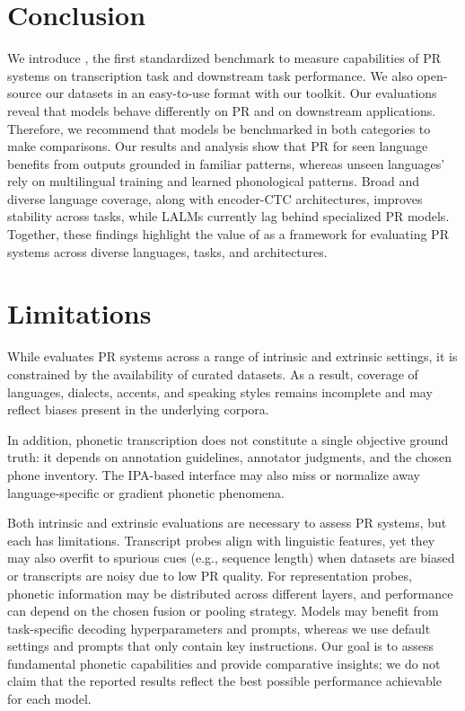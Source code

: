 \section{Conclusion}
We introduce \bench, the first standardized benchmark to measure capabilities of PR systems on transcription task and downstream task performance.
We also open-source our datasets in an easy-to-use format with our toolkit.
Our evaluations reveal that models behave differently on PR and on downstream applications.
Therefore, we recommend that models be benchmarked in both categories to make comparisons.
Our results and analysis show that 
PR for seen language benefits from outputs grounded in familiar patterns, whereas unseen languages' rely on multilingual training and learned phonological patterns. 
Broad and diverse language coverage, along with encoder-CTC architectures, improves stability across tasks, 
while LALMs currently lag behind specialized PR models.
Together, these findings highlight the value of \bench as a framework for evaluating PR systems across diverse languages, tasks, and architectures.

\section*{Limitations}
While \bench evaluates PR systems across a range of intrinsic and extrinsic settings, it is constrained by the availability of curated datasets. As a result, coverage of languages, dialects, accents, and speaking styles remains incomplete and may reflect biases present in the underlying corpora.

In addition, phonetic transcription does not constitute a single objective ground truth: it depends on annotation guidelines, annotator judgments, and the chosen phone inventory. The IPA-based interface may also miss or normalize away language-specific or gradient phonetic phenomena.

Both intrinsic and extrinsic evaluations are necessary to assess PR systems, but each has limitations. Transcript probes align with linguistic features, yet they may also overfit to spurious cues (e.g., sequence length) when datasets are biased or transcripts are noisy due to low PR quality.
For representation probes, phonetic information may be distributed across different layers, and performance can depend on the chosen fusion or pooling strategy.
Models may benefit from task-specific decoding hyperparameters and prompts, whereas we use default settings and prompts that only contain key instructions. 
Our goal is to assess fundamental phonetic capabilities and provide comparative insights; we do not claim that the reported results reflect the best possible performance achievable for each model.

